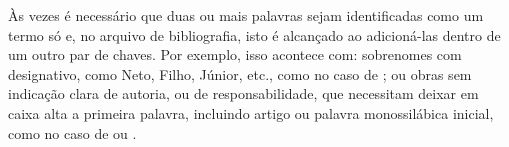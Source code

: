 Às vezes é necessário que duas ou mais palavras sejam identificadas como um termo só e, no arquivo de bibliografia, isto é alcançado ao adicioná-las dentro de um outro par de chaves. Por exemplo, isso acontece com: sobrenomes com designativo, como Neto, Filho, Júnior, etc., como no caso de \textcite{parte-evento:ex2}; ou obras sem indicação clara de autoria, ou de responsabilidade, que necessitam deixar em caixa alta a primeira palavra, incluindo artigo ou palavra monossilábica inicial, como no caso de  ou .
